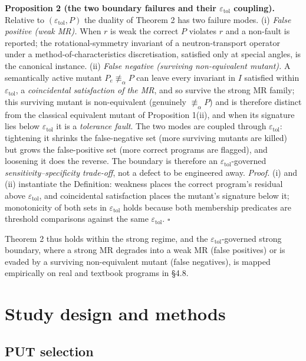 \documentclass[acmsmall,screen,review]{acmart}
\begin{document}
\textbf{Proposition 2 (the two boundary failures and their
$\varepsilon_{\mathrm{tol}}$ coupling).} Relative to
$(\varepsilon_{\mathrm{tol}}, P)$ the duality of Theorem 2 has two
failure modes. (i) \emph{False positive (weak MR).} When $r$ is weak the
correct $P$ violates $r$ and a non-fault is reported; the
rotational-symmetry invariant of a neutron-transport operator under a
method-of-characteristics discretisation, satisfied only at special
angles, is the canonical instance. (ii) \emph{False negative (surviving
non-equivalent mutant).} A semantically active mutant
$P_e \not\equiv_\alpha P$ can leave every invariant in $I$ satisfied
within $\varepsilon_{\mathrm{tol}}$, a \emph{coincidental satisfaction
of the MR}, and so survive the strong MR family; this surviving mutant
is non-equivalent (genuinely $\not\equiv_\alpha P$) and is therefore
distinct from the classical equivalent mutant of Proposition 1(ii), and
when its signature lies below $\varepsilon_{\mathrm{tol}}$ it is a
\emph{tolerance fault}. The two modes are coupled through
$\varepsilon_{\mathrm{tol}}$: tightening it shrinks the false-negative
set (more surviving mutants are killed) but grows the false-positive set
(more correct programs are flagged), and loosening it does the reverse.
The boundary is therefore an $\varepsilon_{\mathrm{tol}}$-governed
\emph{sensitivity--specificity trade-off}, not a defect to be engineered
away. \emph{Proof.} (i) and (ii) instantiate the Definition: weakness
places the correct program's residual above $\varepsilon_{\mathrm{tol}}$,
and coincidental satisfaction places the mutant's signature below it;
monotonicity of both sets in $\varepsilon_{\mathrm{tol}}$ holds because
both membership predicates are threshold comparisons against the same
$\varepsilon_{\mathrm{tol}}$. $\square$

Theorem 2 thus holds within the strong regime, and the
$\varepsilon_{\mathrm{tol}}$-governed strong boundary, where a strong
MR degrades into a weak MR (false positives) or is evaded by a surviving
non-equivalent mutant (false negatives), is mapped empirically on real
and textbook programs in §4.8.


\section{Study design and methods}\label{experimental-subjects-and-operator-framework}

\subsection{PUT selection}\label{put-selection-12-puts-4-classes}
\end{document}
